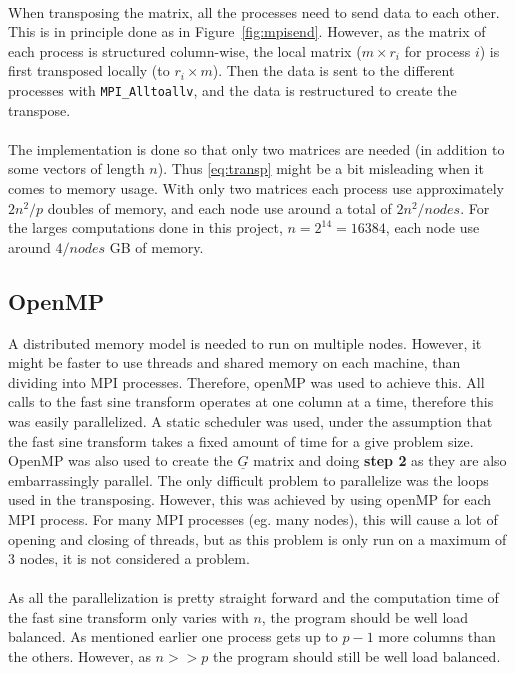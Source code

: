 \\
When transposing the matrix, all the processes need to send data to each other. This is in principle done as in Figure~\ref{fig:mpisend}. However, as the matrix of each process is structured column-wise, the local matrix ($m \times r_i$ for process $i$) is first transposed locally (to $r_i \times m$). Then the data is sent to the different processes with \verb+MPI_Alltoallv+, and the data is restructured to create the transpose. \\
\\
The implementation is done so that only two matrices are needed (in addition to some vectors of length $n$). Thus \ref{eq:transp} might be a bit misleading when it comes to memory usage. With only two matrices each process use approximately $2 n^2/p$ doubles of memory, and each node use around a total of $2 n^2/nodes$. For the larges computations done in this project, $n = 2^{14} = 16384$, each node use around $4/nodes$ GB of memory.
%
\subsection{OpenMP}
\label{sub:OpenMP}
A distributed memory model is needed to run on multiple nodes. However, it might be faster to use threads and shared memory on each machine, than dividing into MPI processes. Therefore, openMP was used to achieve this. 
All calls to the fast sine transform operates at one column at a time, therefore this was easily parallelized. A static scheduler was used, under the assumption that the fast sine transform takes a fixed amount of time for a give problem size. OpenMP was also used to create the $\underline{G}$ matrix and doing \textbf{step 2} as they are also embarrassingly parallel. The only difficult problem to parallelize was the loops used in the transposing. However, this was achieved by using openMP for each MPI process. For many MPI processes (eg. many nodes), this will cause a lot of opening and closing of threads, but as this problem is only run on a maximum of 3 nodes, it is not considered a problem. \\
\\
As all the parallelization is pretty straight forward and the computation time of the fast sine transform only varies with $n$, the program should be well load balanced. As mentioned earlier one process gets up to $p-1$ more columns than the others. However, as $n >> p$ the program should still be well load balanced.
%
%

